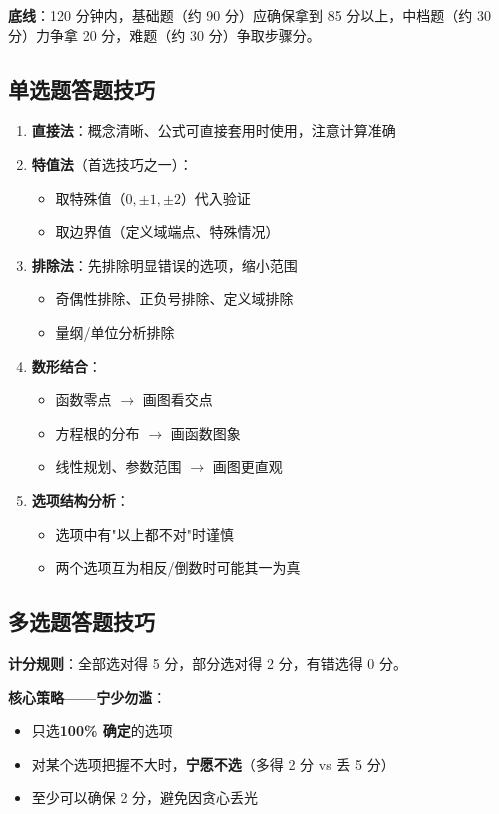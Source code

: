 \textbf{底线}：120 分钟内，基础题（约 90 分）应确保拿到 85 分以上，中档题（约 30 分）力争拿 20 分，难题（约 30 分）争取步骤分。

\subsection{单选题答题技巧}

\begin{enumerate}
  \item \textbf{直接法}：概念清晰、公式可直接套用时使用，注意计算准确
  \item \textbf{特值法}（首选技巧之一）：
    \begin{itemize}
      \item 取特殊值（$0,\pm1,\pm2$）代入验证
      \item 取边界值（定义域端点、特殊情况）
    \end{itemize}
  \item \textbf{排除法}：先排除明显错误的选项，缩小范围
    \begin{itemize}
      \item 奇偶性排除、正负号排除、定义域排除
      \item 量纲/单位分析排除
    \end{itemize}
  \item \textbf{数形结合}：
    \begin{itemize}
      \item 函数零点 $\to$ 画图看交点
      \item 方程根的分布 $\to$ 画函数图象
      \item 线性规划、参数范围 $\to$ 画图更直观
    \end{itemize}
  \item \textbf{选项结构分析}：
    \begin{itemize}
      \item 选项中有"以上都不对"时谨慎
      \item 两个选项互为相反/倒数时可能其一为真
    \end{itemize}
\end{enumerate}

\subsection{多选题答题技巧}

\textbf{计分规则}：全部选对得 5 分，部分选对得 2 分，有错选得 0 分。

\textbf{核心策略——宁少勿滥}：
\begin{itemize}
  \item 只选\textbf{100\% 确定}的选项
  \item 对某个选项把握不大时，\textbf{宁愿不选}（多得 2 分 vs 丢 5 分）
  \item 至少可以确保 2 分，避免因贪心丢光
\end{itemize}

